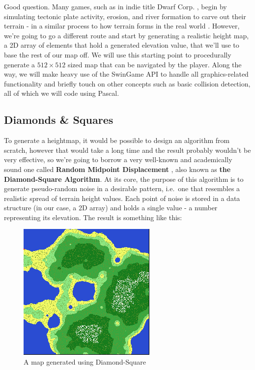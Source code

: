 \documentclass{article}
\begin{document}
Good question. Many games, such as in indie title Dwarf Corp. \parencite{dwarfcorp}, begin by simulating tectonic plate activity, erosion, and river formation to carve out their terrain -  in a similar process to how terrain forms in the real world \parencite[pp. 46]{huggett}. However, we're going to go a different route and start by generating a realistic height map, a 2D array of elements that hold a generated elevation value, that we'll use to base the rest of our map off. We will use this starting point to procedurally generate a $512 \times 512$ sized map that can be navigated by the player. Along the way, we will make heavy use of the SwinGame API to handle all graphics-related functionality and briefly touch on other concepts such as basic collision detection, all of which we will code using Pascal.
	
	
\subsection{Diamonds \& Squares}


To generate a heightmap, it would be possible to design an algorithm from scratch, however that would take a long time and the result probably wouldn't be very effective, so we're going to borrow a very well-known and academically sound one called \textbf{Random Midpoint Displacement} \parencite{fournier}, also known as \textbf{the Diamond-Square Algorithm}. At its core, the purpose of this algorithm is to generate pseudo-random noise in a desirable pattern, i.e.~one that resembles a realistic spread of terrain height values. Each point of noise is stored in a data structure (in our case, a 2D array) and holds a single value - a number representing its elevation. The result is something like this:
	
\begin{figure}[H]
	\centering
	\includegraphics{map.jpg}
	\renewcommand{\figurename}{Example}
	\caption{A map generated using Diamond-Square}
\end{figure}
\end{document}
